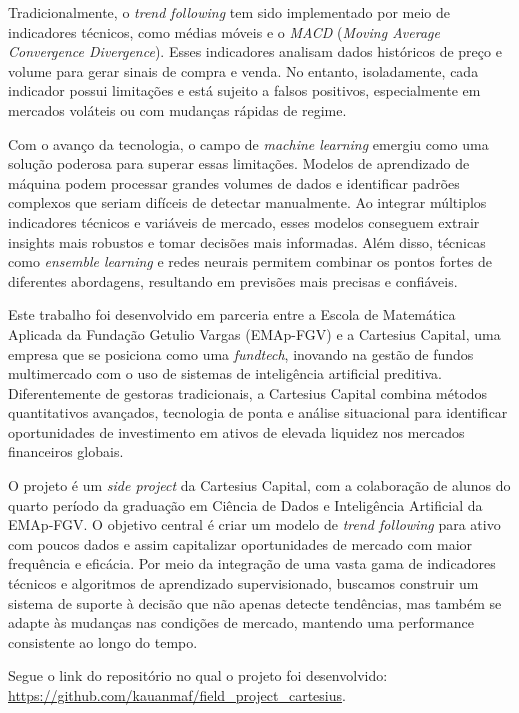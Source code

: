 \documentclass{article}
\begin{document}
Tradicionalmente, o \textit{trend following} tem sido implementado por meio de indicadores técnicos, como médias móveis e o \textit{MACD} (\textit{Moving Average Convergence Divergence}). Esses indicadores analisam dados históricos de preço e volume para gerar sinais de compra e venda. No entanto, isoladamente, cada indicador possui limitações e está sujeito a falsos positivos, especialmente em mercados voláteis ou com mudanças rápidas de regime.

Com o avanço da tecnologia, o campo de \textit{machine learning} emergiu como uma solução poderosa para superar essas limitações. Modelos de aprendizado de máquina podem processar grandes volumes de dados e identificar padrões complexos que seriam difíceis de detectar manualmente. Ao integrar múltiplos indicadores técnicos e variáveis de mercado, esses modelos conseguem extrair insights mais robustos e tomar decisões mais informadas. Além disso, técnicas como \textit{ensemble learning} e redes neurais permitem combinar os pontos fortes de diferentes abordagens, resultando em previsões mais precisas e confiáveis.

Este trabalho foi desenvolvido em parceria entre a Escola de Matemática Aplicada da Fundação Getulio Vargas (EMAp-FGV) e a Cartesius Capital, uma empresa que se posiciona como uma \textit{fundtech}, inovando na gestão de fundos multimercado com o uso de sistemas de inteligência artificial preditiva. Diferentemente de gestoras tradicionais, a Cartesius Capital combina métodos quantitativos avançados, tecnologia de ponta e análise situacional para identificar oportunidades de investimento em ativos de elevada liquidez nos mercados financeiros globais.

O projeto é um \textit{side project} da Cartesius Capital, com a colaboração de alunos do quarto período da graduação em Ciência de Dados e Inteligência Artificial da EMAp-FGV. O objetivo central é criar um modelo de \textit{trend following} para ativo com poucos dados e assim capitalizar oportunidades de mercado com maior frequência e eficácia. Por meio da integração de uma vasta gama de indicadores técnicos e algoritmos de aprendizado supervisionado, buscamos construir um sistema de suporte à decisão que não apenas detecte tendências, mas também se adapte às mudanças nas condições de mercado, mantendo uma performance consistente ao longo do tempo.

Segue o link do repositório no qual o projeto foi desenvolvido: \url{https://github.com/kauanmaf/field_project_cartesius}.
\end{document}
